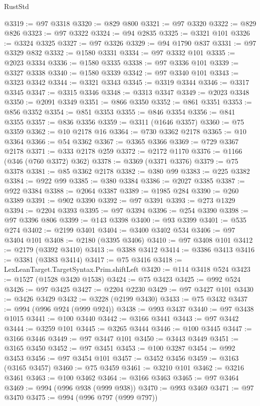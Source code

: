 \begin{lexlean}{RustStd}
\begin{coremodule}
@3319 := @97 @3318
@3320 := @829 @800
@3321 := @97 @3320
@3322 := @829 @826
@3323 := @97 @3322
@3324 := @94 @2835
@3325 := @3321 @101
@3326 := @3324 @3325
@3327 := @97 @3326
@3329 := @94 @1790 @837
@3331 := @97 @3329 @832
@3332 := @1580 @3331
@3334 := @97 @3332 @101
@3335 := @2023 @3334
@3336 := @1580 @3335
@3338 := @97 @3336 @101
@3339 := @3327 @3338
@3340 := @1580 @3339
@3342 := @97 @3340 @101
@3343 := @3323 @3342
@3344 := @3321 @3343
@3345 := @3319 @3344
@3346 := @3317 @3345
@3347 := @3315 @3346
@3348 := @3313 @3347
@3349 := @2023 @3348
@3350 := @2091 @3349
@3351 := @866 @3350
@3352 := @861 @3351
@3353 := @856 @3352
@3354 := @851 @3353
@3355 := @846 @3354
@3356 := @841 @3355
@3357 := @836 @3356
@3359 := @3311 (@1646 @3357)
@3360 := @75 @3359
@3362 := @10 @2178 @16
@3364 := @730 @3362 @2178
@3365 := @10 @3364
@3366 := @54 @3362
@3367 := @3365 @3366
@3369 := @729 @3367 @2178
@3371 := @333 @2178 @259
@3372 := @2172 @1170
@3376 := @1166 (@346 (@760 @3372) @362)
@3378 := @3369 (@3371 @3376)
@3379 := @75 @3378
@3381 := @85 @3362 @2178
@3382 := @380 @99
@3383 := @225 @3382
@3384 := @922 @99
@3385 := @380 @3384
@3386 := @2027 @3385
@3387 := @922 @3384
@3388 := @2064 @3387
@3389 := @1985 @284
@3390 := @260 @3389
@3391 := @902 @3390
@3392 := @97 @3391
@3393 := @273 @1329
@3394 := @2204 @3393
@3395 := @97 @3394
@3396 := @254 @3390
@3398 := @97 @3396 @806
@3399 := @143 @3398
@3400 := @93 @3399
@3401 := @535 @274
@3402 := @2199 @3401
@3404 := @3400 @3402 @534
@3406 := @97 @3404 @101
@3408 := @2180 (@3395 @3406)
@3410 := @97 @3408 @101
@3412 := @2179 (@3392 @3410)
@3413 := @3388 @3412
@3414 := @3386 @3413
@3416 := @3381 (@3383 @3414)
@3417 := @75 @3416
@3418 := LexLeanTarget.TargetSyntax.Prim.shiftLeft
@3420 := @114 @3418 @524
@3423 := @1527 (@1528 @3420 @1538)
@3424 := @75 @3423
@3425 := @992 @524
@3426 := @97 @3425
@3427 := @2204 @2230
@3429 := @97 @3427 @101
@3430 := @3426 @3429
@3432 := @3228 (@2199 @3430)
@3433 := @75 @3432
@3437 := @994 (@996 @924 (@999 @924))
@3438 := @993 @3437
@3440 := @97 @3438 @1015
@3441 := @100 @3440
@3442 := @3166 @3441
@3443 := @97 @3442
@3444 := @3259 @101
@3445 := @3265 @3444
@3446 := @100 @3445
@3447 := @3166 @3446
@3449 := @97 @3447 @101
@3450 := @3443 @3449
@3451 := @3165 @3450
@3452 := @97 @3451
@3453 := @100 @3287
@3454 := @992 @3453
@3456 := @97 @3454 @101
@3457 := @3452 @3456
@3459 := @3163 (@3165 @3457)
@3460 := @75 @3459
@3461 := @3210 @101
@3462 := @3216 @3461
@3463 := @100 @3462
@3464 := @3166 @3463
@3465 := @97 @3464
@3469 := @994 (@996 @938 (@999 @938))
@3470 := @993 @3469
@3471 := @97 @3470
@3475 := @994 (@996 @797 (@999 @797))

\end{coremodule}
\end{lexlean}
